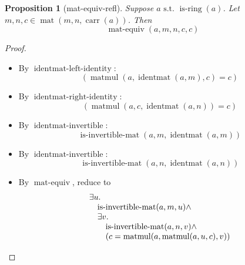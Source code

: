 \documentclass[11pt]{article}
\theoremstyle{plain}
\newtheorem{proposition}{Proposition}
\begin{document}
\begin{proposition}[mat-equiv-refl]
Suppose $a \text{ s.t. } \operatorname{is\text{-}ring}(a)$. Let $m, n, c \in \operatorname{mat}(m, n, \operatorname{carr}(a))$. Then
\begin{equation*}
\operatorname{mat\text{-}equiv}(a, m, n, c, c)
\end{equation*}

\end{proposition}

\begin{proof}
\begin{itemize}[leftmargin=2.8em, itemsep=4pt, parsep=1pt]
  \item[\textbf{4}] By $\operatorname{identmat\text{-}left\text{-}identity}$:
\begin{equation*}
(\operatorname{matmul}(a, \operatorname{identmat}(a, m), c) = c)
\end{equation*}

  \item[\textbf{5}] By $\operatorname{identmat\text{-}right\text{-}identity}$:
\begin{equation*}
(\operatorname{matmul}(a, c, \operatorname{identmat}(a, n)) = c)
\end{equation*}

  \item[\textbf{6}] By $\operatorname{identmat\text{-}invertible}$:
\begin{equation*}
\operatorname{is\text{-}invertible\text{-}mat}(a, m, \operatorname{identmat}(a, m))
\end{equation*}

  \item[\textbf{7}] By $\operatorname{identmat\text{-}invertible}$:
\begin{equation*}
\operatorname{is\text{-}invertible\text{-}mat}(a, n, \operatorname{identmat}(a, n))
\end{equation*}

  \item[\textbf{8}] By $\operatorname{mat\text{-}equiv}$, reduce to
\begin{equation*}
\begin{array}{@{}l@{}} \exists u. \\ \quad \operatorname{is\text{-}invertible\text{-}mat}(a, m, u) \wedge \\ \quad \exists v. \\ \quad \quad \operatorname{is\text{-}invertible\text{-}mat}(a, n, v) \wedge \\ \quad \quad (c = \operatorname{matmul}(a, \operatorname{matmul}(a, u, c), v)) \end{array}
\end{equation*}


\end{itemize}
\end{proof}
\end{document}
